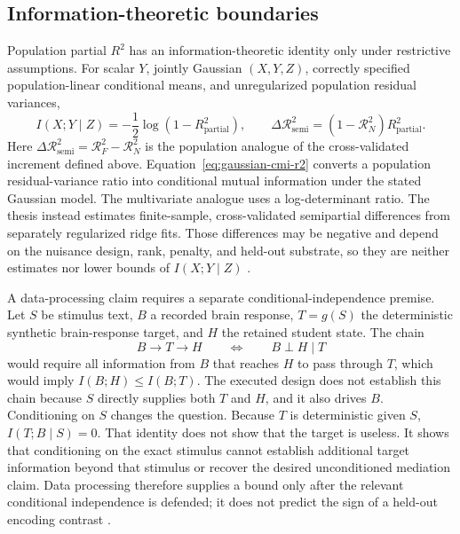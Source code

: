 \subsection{Information-theoretic boundaries}

Population partial \(R^2\) has an information-theoretic identity only under restrictive assumptions.
For scalar \(Y\), jointly Gaussian \((X,Y,Z)\), correctly specified population-linear conditional means, and unregularized population residual variances,
\begin{equation}
  I(X;Y\mid Z)
  =
  -\frac{1}{2}\log\!\left(1-R_{\mathrm{partial}}^2\right),
  \qquad
  \Delta\mathcal R_{\mathrm{semi}}^2
  =
  \left(1-\mathcal R_N^2\right)R_{\mathrm{partial}}^2.
  \label{eq:gaussian-cmi-r2}
\end{equation}
Here \(\Delta\mathcal R_{\mathrm{semi}}^2=\mathcal R_F^2-\mathcal R_N^2\) is the population analogue of the cross-validated increment defined above.
Equation~\ref{eq:gaussian-cmi-r2} converts a population residual-variance ratio into conditional mutual information under the stated Gaussian model.
The multivariate analogue uses a log-determinant ratio.
The thesis instead estimates finite-sample, cross-validated semipartial differences from separately regularized ridge fits.
Those differences may be negative and depend on the nuisance design, rank, penalty, and held-out substrate, so they are neither estimates nor lower bounds of \(I(X;Y\mid Z)\) \autocite{cover2006}.

\begin{samepage}
A data-processing claim requires a separate conditional-independence premise.
Let \(S\) be stimulus text, \(B\) a recorded brain response, \(T=g(S)\) the deterministic synthetic brain-response target, and \(H\) the retained student state.
The chain
\[
  B\longrightarrow T\longrightarrow H
  \qquad\Longleftrightarrow\qquad
  B\perp H\mid T
\]
would require all information from \(B\) that reaches \(H\) to pass through \(T\), which would imply \(I(B;H)\leq I(B;T)\).
The executed design does not establish this chain because \(S\) directly supplies both \(T\) and \(H\), and it also drives \(B\).
Conditioning on \(S\) changes the question.
Because \(T\) is deterministic given \(S\), \(I(T;B\mid S)=0\).
That identity does not show that the target is useless.
It shows that conditioning on the exact stimulus cannot establish additional target information beyond that stimulus or recover the desired unconditioned mediation claim.
Data processing therefore supplies a bound only after the relevant conditional independence is defended; it does not predict the sign of a held-out encoding contrast \autocite{cover2006}. 
\end{samepage}

